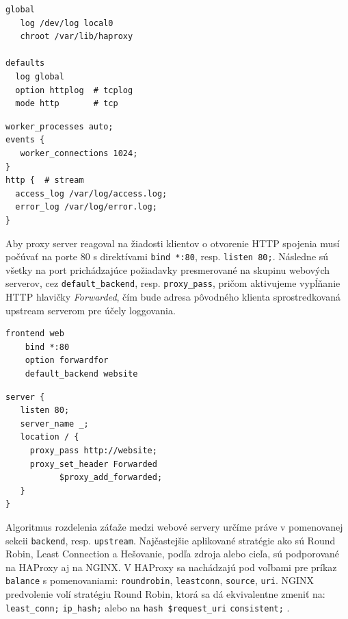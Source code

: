 \documentclass[12pt, a4paper]{article}
\begin{document}
\noindent\begin{minipage}{.48\textwidth}
\begin{lstlisting}[caption=HAProxy mód prevádzky a logging]
global
   log /dev/log local0
   chroot /var/lib/haproxy

defaults
  log global
  option httplog  # tcplog
  mode http       # tcp
\end{lstlisting}
\end{minipage}\hfill
\begin{minipage}{.48\textwidth}
\begin{lstlisting}[caption=NGINX mód prevádzky a logging]
worker_processes auto;
events {
   worker_connections 1024;
}
http {  # stream
  access_log /var/log/access.log;
  error_log /var/log/error.log;
}
\end{lstlisting}
\end{minipage}

Aby proxy server reagoval na žiadosti klientov o otvorenie HTTP spojenia musí počúvať na porte 80 
s direktívami \verb|bind *:80|, resp. \verb|listen 80;|. Následne sú všetky na port prichádzajúce 
požiadavky presmerované na skupinu webových serverov, cez \verb|default_backend|, resp. \verb|proxy_pass|, 
pričom aktivujeme vypĺňanie HTTP hlavičky \emph{Forwarded}, čím bude adresa pôvodného klienta 
sprostredkovaná upstream serverom pre účely loggovania.

\noindent\begin{minipage}{.48\textwidth}
\begin{lstlisting}[caption=HAProxy: preposielanie požiadavok na pool serverov za reverznou proxy]
frontend web
    bind *:80
    option forwardfor
    default_backend website
\end{lstlisting}
\end{minipage}\hfill
\begin{minipage}{.48\textwidth}
\begin{lstlisting}[caption=NGINX: preposielanie požiadavok na pool serverov za reverznou proxy]
server {
   listen 80;
   server_name _;
   location / { 
     proxy_pass http://website;
     proxy_set_header Forwarded 
           $proxy_add_forwarded;
   }
}
\end{lstlisting}
\end{minipage}

Algoritmus rozdelenia záťaže medzi webové servery určíme práve v pomenovanej sekcii \verb|backend|, resp.
\verb|upstream|. Najčastejšie aplikované stratégie ako sú Round Robin, Least Connection a Hešovanie, podľa 
zdroja alebo cieľa, sú podporované na HAProxy aj na NGINX. V HAProxy sa nachádzajú pod voľbami pre príkaz 
\verb|balance| s pomenovaniami: \verb|roundrobin|, \verb|leastconn|, \verb|source|, \verb|uri|.
\cite{haproxy-docs} NGINX predvolenie volí stratégiu Round Robin, ktorá sa dá ekvivalentne zmeniť na: 
\verb|least_conn;| \verb|ip_hash;| alebo na \verb|hash $request_uri| \verb|consistent;| 
\cite{nginx-http-balancer}.
\end{document}
